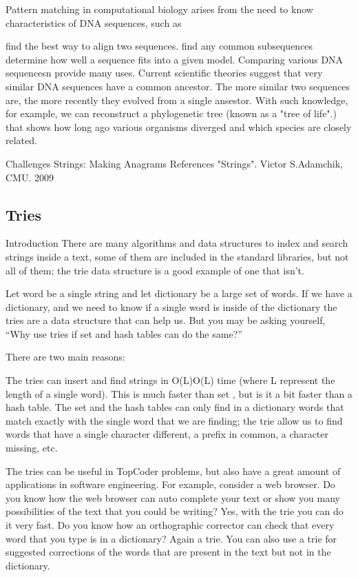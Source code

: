 Pattern matching in computational biology arises from the need to know characteristics of DNA sequences, such as

find the best way to align two sequences.
find any common subsequences
determine how well a sequence fits into a given model.
Comparing various DNA sequencesn provide many uses. Current scientific theories suggest that very similar DNA sequences have a common ancestor. The more similar two sequences are, the more recently they evolved from a single ansestor. With such knowledge, for example, we can reconstruct a phylogenetic tree (known as a "tree of life".) that shows how long ago various organisms diverged and which species are closely related.

Challenges
Strings: Making Anagrams
References
"Strings". Victor S.Adamchik, CMU. 2009

\subsection{Tries}

Introduction
There are many algorithms and data structures to index and search strings inside a text, some of them are included in the standard libraries, but not all of them; the trie data structure is a good example of one that isn’t.

Let word be a single string and let dictionary be a large set of words. If we have a dictionary, and we need to know if a single word is inside of the dictionary the tries are a data structure that can help us. But you may be asking yourself, “Why use tries if set and hash tables can do the same?”

There are two main reasons:

The tries can insert and find strings in O(L)O(L) time (where L represent the length of a single word). This is much faster than set , but is it a bit faster than a hash table. The set and the hash tables can only find in a dictionary words that match exactly with the single word that we are finding; the trie allow us to find words that have a single character different, a prefix in common, a character missing, etc.

The tries can be useful in TopCoder problems, but also have a great amount of applications in software engineering. For example, consider a web browser. Do you know how the web browser can auto complete your text or show you many possibilities of the text that you could be writing? Yes, with the trie you can do it very fast. Do you know how an orthographic corrector can check that every word that you type is in a dictionary? Again a trie. You can also use a trie for suggested corrections of the words that are present in the text but not in the dictionary.

